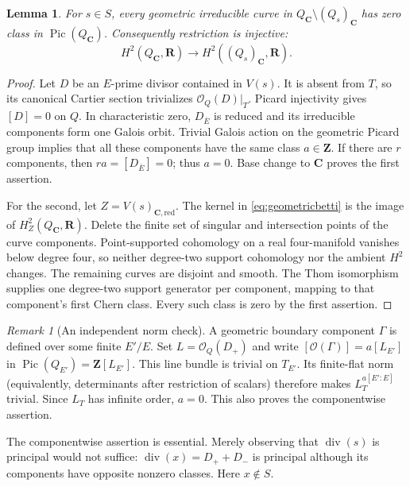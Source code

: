 \documentclass[11pt,a4paper]{article}
\newtheorem{lemma}[theorem]{Lemma}
\theoremstyle{remark}
\newtheorem{remark}[theorem]{Remark}
\newcommand{\Z}{\mathbf Z}
\newcommand{\R}{\mathbf R}
\newcommand{\C}{\mathbf C}
\newcommand{\OO}{\mathcal O}
\newcommand{\Pic}{\operatorname{Pic}}
\newcommand{\divisor}{\operatorname{div}}
\begin{document}
\begin{lemma}\label{lem:geometriccomponents}
For \(s\in S\), every geometric irreducible curve in
\(Q_{\C}\setminus(Q_s)_{\C}\) has zero class in \(\Pic(Q_{\C})\).
Consequently restriction is injective:
\begin{equation}\label{eq:geometricbetti}
 H^2(Q_{\C},\R)\longrightarrow H^2((Q_s)_{\C},\R).
\end{equation}
\end{lemma}
\begin{proof}
Let \(D\) be an \(E\)-prime divisor contained in \(V(s)\).
It is absent from \(T\), so its canonical Cartier section
trivializes \(\OO_Q(D)|_T\). Picard injectivity gives
\([D]=0\) on \(Q\).
In characteristic zero, \(D_{\overline E}\) is reduced and
its irreducible components form one Galois orbit.
Trivial Galois action on the geometric Picard group implies
that all these components have the same class \(a\in\Z\).
If there are \(r\) components, then \(ra=[D_{\overline E}]=0\);
thus \(a=0\). Base change to \(\C\) proves the first assertion.

For the second, let \(Z=V(s)_{\C,\mathrm{red}}\).
The kernel in \eqref{eq:geometricbetti} is the image of
\(H^2_Z(Q_{\C},\R)\).
Delete the finite set of singular and intersection points of
the curve components. Point-supported cohomology on a real
four-manifold vanishes below degree four, so neither
degree-two support cohomology nor the ambient \(H^2\) changes.
The remaining curves are disjoint and smooth.
The Thom isomorphism supplies one degree-two support generator
per component, mapping to that component's first Chern class.
Every such class is zero by the first assertion.
\end{proof}

\begin{remark}[An independent norm check]
A geometric boundary component \(\Gamma\) is defined over some finite
\(E'/E\). Set \(L=\OO_Q(D_+)\) and write
\([\OO(\Gamma)]=a[L_{E'}]\) in \(\Pic(Q_{E'})=\Z[L_{E'}]\).
This line bundle is trivial on \(T_{E'}\). Its finite-flat norm
(equivalently, determinants after restriction of scalars) therefore
makes \(L_T^{a[E':E]}\) trivial. Since \(L_T\) has infinite order,
\(a=0\). This also proves the componentwise assertion.
\end{remark}

The componentwise assertion is essential. Merely observing that
\(\divisor(s)\) is principal would not suffice:
\(\divisor(x)=D_++D_-\) is principal although its components have
opposite nonzero classes. Here \(x\notin S\).
\end{document}
